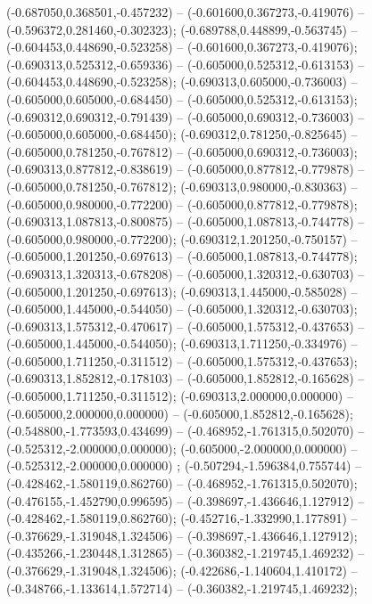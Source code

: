  (-0.687050,0.368501,-0.457232) -- (-0.601600,0.367273,-0.419076) -- (-0.596372,0.281460,-0.302323);
 (-0.689788,0.448899,-0.563745) -- (-0.604453,0.448690,-0.523258) -- (-0.601600,0.367273,-0.419076);
 (-0.690313,0.525312,-0.659336) -- (-0.605000,0.525312,-0.613153) -- (-0.604453,0.448690,-0.523258);
 (-0.690313,0.605000,-0.736003) -- (-0.605000,0.605000,-0.684450) -- (-0.605000,0.525312,-0.613153);
 (-0.690312,0.690312,-0.791439) -- (-0.605000,0.690312,-0.736003) -- (-0.605000,0.605000,-0.684450);
 (-0.690312,0.781250,-0.825645) -- (-0.605000,0.781250,-0.767812) -- (-0.605000,0.690312,-0.736003);
 (-0.690313,0.877812,-0.838619) -- (-0.605000,0.877812,-0.779878) -- (-0.605000,0.781250,-0.767812);
 (-0.690313,0.980000,-0.830363) -- (-0.605000,0.980000,-0.772200) -- (-0.605000,0.877812,-0.779878);
 (-0.690313,1.087813,-0.800875) -- (-0.605000,1.087813,-0.744778) -- (-0.605000,0.980000,-0.772200);
 (-0.690312,1.201250,-0.750157) -- (-0.605000,1.201250,-0.697613) -- (-0.605000,1.087813,-0.744778);
 (-0.690313,1.320313,-0.678208) -- (-0.605000,1.320312,-0.630703) -- (-0.605000,1.201250,-0.697613);
 (-0.690313,1.445000,-0.585028) -- (-0.605000,1.445000,-0.544050) -- (-0.605000,1.320312,-0.630703);
 (-0.690313,1.575312,-0.470617) -- (-0.605000,1.575312,-0.437653) -- (-0.605000,1.445000,-0.544050);
 (-0.690313,1.711250,-0.334976) -- (-0.605000,1.711250,-0.311512) -- (-0.605000,1.575312,-0.437653);
 (-0.690313,1.852812,-0.178103) -- (-0.605000,1.852812,-0.165628) -- (-0.605000,1.711250,-0.311512);
 (-0.690313,2.000000,0.000000) -- (-0.605000,2.000000,0.000000) -- (-0.605000,1.852812,-0.165628);
 (-0.548800,-1.773593,0.434699) -- (-0.468952,-1.761315,0.502070) -- (-0.525312,-2.000000,0.000000);
 (-0.605000,-2.000000,0.000000) -- (-0.525312,-2.000000,0.000000) ;
 (-0.507294,-1.596384,0.755744) -- (-0.428462,-1.580119,0.862760) -- (-0.468952,-1.761315,0.502070);
 (-0.476155,-1.452790,0.996595) -- (-0.398697,-1.436646,1.127912) -- (-0.428462,-1.580119,0.862760);
 (-0.452716,-1.332990,1.177891) -- (-0.376629,-1.319048,1.324506) -- (-0.398697,-1.436646,1.127912);
 (-0.435266,-1.230448,1.312865) -- (-0.360382,-1.219745,1.469232) -- (-0.376629,-1.319048,1.324506);
 (-0.422686,-1.140604,1.410172) -- (-0.348766,-1.133614,1.572714) -- (-0.360382,-1.219745,1.469232);
